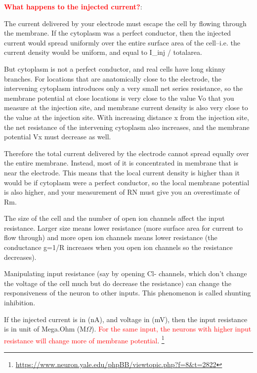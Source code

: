 \begin{mdframed}
\textcolor{red}{\bf What happens to the injected current?}:

The current delivered by your electrode must escape the cell by flowing through
the membrane. If the cytoplasm was a perfect conductor, then the injected
current would spread uniformly over the entire surface area of the cell--i.e.
the current density would be uniform, and equal to I\_inj / totalarea.


But cytoplasm is not a perfect conductor, and real cells have long skinny
branches. For locations that are anatomically close to the electrode, the
intervening cytoplasm introduces only a very small net series resistance, so the
membrane potential at close locations is very close to the value Vo that you
measure at the injection site, and membrane current density is also very close
to the value at the injection site. With increasing distance x from the
injection site, the net resistance of the intervening cytoplasm also increases,
and the membrane potential Vx must decrease as well.

Therefore the total current delivered by the electrode cannot spread equally over the
entire membrane. Instead, most of it is concentrated in membrane that is near the
electrode. This means that the local current density is higher than it would be if
cytoplasm were a perfect conductor, so the local membrane potential is also higher,
and your measurement of RN must give you an overestimate of Rm.

\end{mdframed}

\begin{mdframed}
The size of the cell and the number of open ion channels affect the input
resistance. Larger size means lower resistance (more surface area for current to
flow through) and more open ion channels means lower resistance (the conductance
g=1/R increases when you open ion channels so the resistance decreases).   

Manipulating input resistance (say by opening Cl- channels, which don't change
the voltage of the cell much but do decrease the resistance) can change the
responsiveness of the neuron to other inputs. This phenomenon is called
shunting inhibition.   
\end{mdframed}

If the injected current is in (nA), and voltage in (mV), then the input
resistance is in unit of Mega.Ohm (M$\Omega$). \textcolor{red}{For the same
input, the neurons with higher input resistance will change more of membrane
potential}. 
\footnote{\url{https://www.neuron.yale.edu/phpBB/viewtopic.php?f=8&t=2822}}


